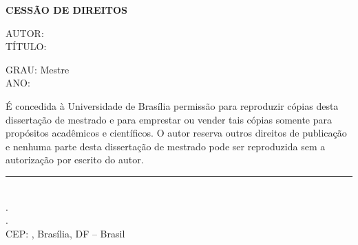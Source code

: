 \begin{flushleft}
 \textbf{CESSÃO DE DIREITOS}
 
AUTOR: \imprimirautor \\
TÍTULO: \imprimirtitulo\\
\vspace{0.25 in}

GRAU: Mestre\\
ANO: \imprimirdata

\end{flushleft}
É concedida à Universidade de Brasília permissão para reproduzir cópias desta dissertação
de mestrado e para emprestar ou vender tais cópias somente para propósitos acadêmicos e
científicos. O autor reserva outros direitos de publicação e nenhuma parte desta dissertação
de mestrado pode ser reproduzida sem a autorização por escrito do autor.

\begin{flushleft}
\vspace{0.25 in}
\rule{10cm}{.1mm}\\
\imprimirdata.\\
\imprimirendereco.\\
CEP: \imprimirCEP, Brasília, DF -- Brasil\\
\end{flushleft}

\newpage










